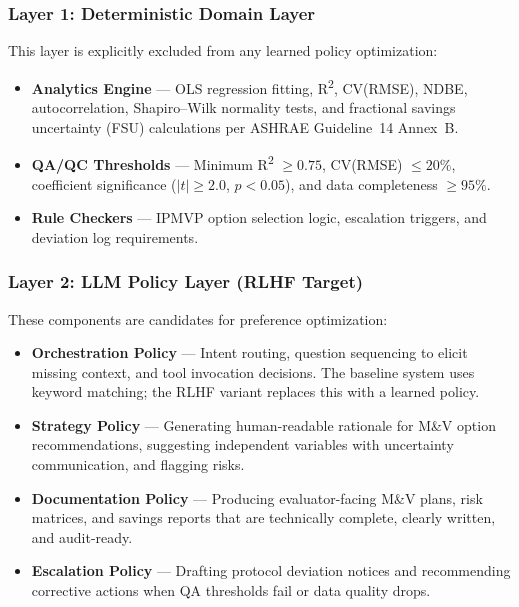 \documentclass[11pt,a4paper]{article}
\begin{document}
\subsubsection{Layer 1: Deterministic Domain Layer}
This layer is explicitly excluded from any learned policy optimization:
\begin{itemize}
    \item \textbf{Analytics Engine} — OLS regression fitting, R\textsuperscript{2}, CV(RMSE), NDBE, autocorrelation, Shapiro--Wilk normality tests, and fractional savings uncertainty (FSU) calculations per ASHRAE Guideline~14 Annex~B.
    \item \textbf{QA/QC Thresholds} — Minimum R\textsuperscript{2} $\geq 0.75$, CV(RMSE) $\leq 20\%$, coefficient significance ($|t| \geq 2.0$, $p < 0.05$), and data completeness $\geq 95\%$.
    \item \textbf{Rule Checkers} — IPMVP option selection logic, escalation triggers, and deviation log requirements.
\end{itemize}

\subsubsection{Layer 2: LLM Policy Layer (RLHF Target)}
These components are candidates for preference optimization:
\begin{itemize}
    \item \textbf{Orchestration Policy} — Intent routing, question sequencing to elicit missing context, and tool invocation decisions. The baseline system uses keyword matching; the RLHF variant replaces this with a learned policy.
    \item \textbf{Strategy Policy} — Generating human-readable rationale for M\&V option recommendations, suggesting independent variables with uncertainty communication, and flagging risks.
    \item \textbf{Documentation Policy} — Producing evaluator-facing M\&V plans, risk matrices, and savings reports that are technically complete, clearly written, and audit-ready.
    \item \textbf{Escalation Policy} — Drafting protocol deviation notices and recommending corrective actions when QA thresholds fail or data quality drops.
\end{itemize}
\end{document}
